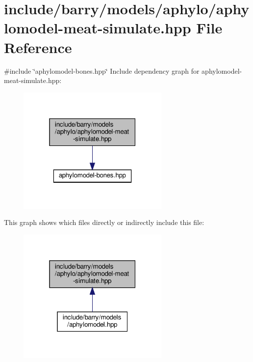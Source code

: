 \hypertarget{aphylomodel-meat-simulate_8hpp}{}\section{include/barry/models/aphylo/aphylomodel-\/meat-\/simulate.hpp File Reference}
\label{aphylomodel-meat-simulate_8hpp}
{\ttfamily \#include \char`\"{}aphylomodel-\/bones.\+hpp\char`\"{}}\newline
Include dependency graph for aphylomodel-\/meat-\/simulate.hpp\+:
\nopagebreak
\begin{figure}[H]
\begin{center}
\leavevmode
\includegraphics[width=211pt]{aphylomodel-meat-simulate_8hpp__incl}
\end{center}
\end{figure}
This graph shows which files directly or indirectly include this file\+:
\nopagebreak
\begin{figure}[H]
\begin{center}
\leavevmode
\includegraphics[width=211pt]{aphylomodel-meat-simulate_8hpp__dep__incl}
\end{center}
\end{figure}
